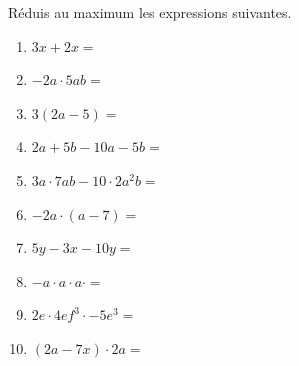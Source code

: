 %
%
    Réduis au maximum les expressions suivantes.
    \begin{enumerate}[cols=2, itemsep=2cm]
        \item \(3x + 2x =\)
        \item \(-2a \cdot 5ab = \)
        \item \(3(2a - 5)=\)
        \item \(2a + 5b - 10a - 5b=\)
        \item \(3a \cdot 7ab - 10 \cdot 2a^2b=\)
        \item \(-2a \cdot (a-7)=\)
        \item \(5y - 3x - 10y =\)
        \item \(-a \cdot a \cdot a \cdot =\)
        \item \(2e \cdot 4ef^3 \cdot -5e^3 = \)
        \item \((2a - 7x) \cdot 2a=\)
    \end{enumerate}
